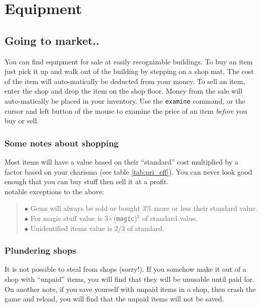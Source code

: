 
\chapter{Equipment}\label{chap:equip}

\section{Going to market..}

You can find equipment for sale at easily recognizable buildings. To buy an
item just pick it up and walk out of the building by stepping on a
shop mat. The cost of the item will auto-matically be
deducted from your money. To sell an item,
enter the shop and drop the item
on the shop floor. Money from the sale will auto-matically be placed in your
inventory. Use the {\tt examine} command, or the cursor and left button
of the mouse to examine the price of an item {\em before} you buy or sell.

\subsection{Some notes about shopping}

Most items will have a value based on their ``standard'' cost
multiplied by a factor based on your charisma (see table \ref{tab:pri_eff}).
You can never look good enough that you can buy stuff then sell
it at a profit. \\

 notable exceptions to the above:
\begin{quote}
   $\bullet$ Gems will always be sold or bought 3\% more or less their standard value. \\
   $\bullet$ For magic stuff value is 3$\times$({\tt magic})$^{3}$ of standard value. \\
   $\bullet$ Unidentified items value is 2/3 of standard.
\end{quote}

\subsection{Plundering shops}

It is not possible to steal from shops (sorry!). If you somehow make
it out of a shop with ``unpaid'' items, you will find that they will
be unusable until paid for. On another note, if you save yourself with
unpaid items in a shop, then crash the game and reload, you will
find that the unpaid items will not be saved.

